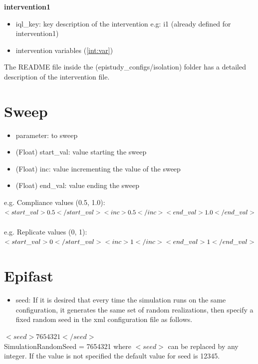 \documentclass[11pt]{article}
\begin{document}
\textbf{intervention1}
\begin{itemize}
\item iql\_key: key description of the intervention e.g: i1 (already defined for intervention1)
\item intervention variables (\ref{int:var})
\end{itemize}

The README file inside the (epistudy\_configs/isolation) folder has a detailed description of the intervention file.

\section{Sweep}
\begin{itemize}
\item parameter: to sweep
\item (Float) start\_val: value starting the sweep
\item (Float) inc: value incrementing the value of the sweep
\item (Float) end\_val: value ending the sweep
\end{itemize}

e.g. Compliance values (0.5, 1.0):\\
$<start\_val>0.5</start\_val>\\
    <inc>0.5</inc>\\
    <end\_val>1.0</end\_val>$
    \\\\
e.g. Replicate values (0, 1):\\
$<start\_val>0</start\_val>\\
    <inc>1</inc>\\
    <end\_val>1</end\_val>$
    
\section{Epifast}
\begin{itemize}
\item seed: If it is desired that every time the simulation runs on the same configuration, it generates the same set of random realizations, then specify a fixed random seed in the xml configuration file as follows.
\end{itemize}
$<seed>7654321</seed>$\\
SimulationRandomSeed = 7654321
where $<seed>$ can be replaced by any integer.
If the value is not specified the default value for seed is 12345.
\end{document}
